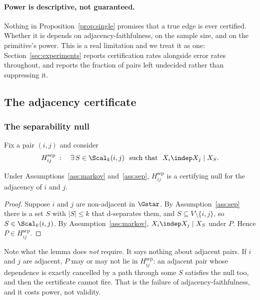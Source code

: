 \paragraph{Power is descriptive, not guaranteed.} Nothing in
Proposition~\ref{prop:single} promises that a true edge is ever certified.
Whether it is depends on adjacency-faithfulness, on the sample size, and on
the primitive's power. This is a real limitation and we treat it as one:
Section~\ref{sec:experiments} reports certification rates alongside error
rates throughout, and reports the fraction of pairs left undecided rather than
suppressing it.

\subsection{The adjacency certificate}\label{sec:adjacency}

\subsubsection{The separability null}\label{sec:sepnull}

Fix a pair $(i,j)$ and consider
\begin{equation}\label{eq:sepnull}
H^{\mathrm{sep}}_{ij} \;:\quad
\exists\, S \in \Scal_k(i,j) \ \text{ such that } \ X_i \indep X_j \mid X_S .
\end{equation}

\begin{lemma}\label{lem:certifying}
Under Assumptions~\ref{ass:markov} and~\ref{ass:sep},
$H^{\mathrm{sep}}_{ij}$ is a certifying null for the adjacency of $i$ and $j$.
\end{lemma}

\begin{proof}
Suppose $i$ and $j$ are non-adjacent in $\Gstar$. By
Assumption~\ref{ass:sep} there is a set $S$ with $|S| \le k$ that d-separates
them, and $S \subseteq V \setminus \{i,j\}$, so $S \in \Scal_k(i,j)$. By
Assumption~\ref{ass:markov}, $X_i \indep X_j \mid X_S$ under $P$. Hence
$P \in H^{\mathrm{sep}}_{ij}$.
\end{proof}

Note what the lemma does \emph{not} require. It says nothing about adjacent
pairs. If $i$ and $j$ are adjacent, $P$ may or may not lie in
$H^{\mathrm{sep}}_{ij}$: an adjacent pair whose dependence is exactly
cancelled by a path through some $S$ satisfies the null too, and then the
certificate cannot fire. That is the failure of adjacency-faithfulness, and it
costs power, not validity.

